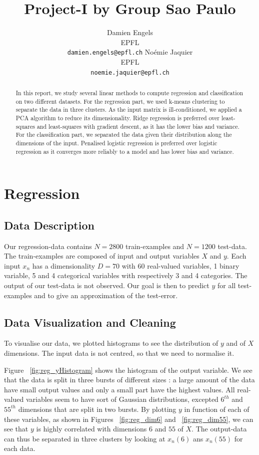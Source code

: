 \documentclass{article} %
\title{Project-I by Group Sao Paulo}
\author{
Damien Engels\\
EPFL \\
\texttt{damien.engels@epfl.ch} \And No\'emie Jaquier\\
EPFL \\
\texttt{noemie.jaquier@epfl.ch} \\
}
\begin{document}
\maketitle

\begin{abstract}
In this report, we study several linear methods to compute regression and classification on two different datasets. For the regression part, we used k-means clustering to separate the data in three clusters. As the input matrix is ill-conditioned, we applied a PCA algorithm to reduce its dimensionality. Ridge regression is preferred over least-squares and least-squares with gradient descent, as it has the lower bias and variance. For the classification part, we separated the data given their distribution along the dimensions of the input. Penalised logistic regression is preferred over logistic regression as it converges more reliably to a model and has lower bias and variance.
\end{abstract}

\section{Regression}
\subsection{Data Description}
Our regression-data contains $N=2800$ train-examples and $N=1200$ test-data. The
train-examples are composed of input and output variables $X$ and $y$. Each
input $x_n$ has a dimensionality $D=70$ with 60 real-valued variables, 1 binary
variable, 5 and 4 categorical variables with respectively 3 and 4 categories.
The output of our test-data is not observed. Our goal is then to predict $y$ for
all test-examples and to give an approximation of the test-error.

\subsection{Data Visualization and Cleaning}
To visualise our data, we plotted histograms to see the distribution of $y$ and
of $X$ dimensions. The input data is not centred, so that we need to normalise
it. 

Figure ~\ref{fig:reg_yHistogram} shows the histogram of the output variable. We
see that the data is split in three bursts of different sizes : a large amount
of the data have small output values and only a small part have the highest
values. All real-valued variables seem to have sort of Gaussian distributions,
excepted $6^{th}$ and $55^{th}$ dimensions that are split in two bursts. By
plotting $y$ in function of each of these variables, as shown in Figures
~\ref{fig:reg_dim6} and ~\ref{fig:reg_dim55}, we can see that $y$ is highly
correlated with dimensions $6$ and $55$ of $X$. The output-data can thus be
separated in three clusters by looking at $x_n(6)$ ans $x_n(55)$ for each data.
\end{document}
